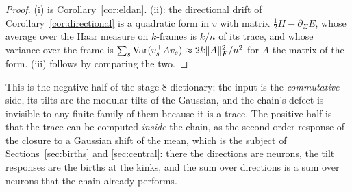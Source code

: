 \begin{proof}
(i) is Corollary~\ref{cor:eldan}. (ii): the directional drift of Corollary~\ref{cor:directional} is a quadratic
form in $v$ with matrix $\tfrac12H-\partial_\Sigma E$, whose average over the Haar measure on $k$-frames is $k/n$ of
its trace, and whose variance over the frame is $\sum_s\operatorname{Var}(v_s^{\top}Av_s)\approx 2k\|A\|_F^2/n^2$ for $A$ the
matrix of the form. (iii) follows by comparing the two.
\end{proof}

This is the negative half of the stage-8 dictionary: the input is the \emph{commutative} side, its tilts are the
modular tilts of the Gaussian, and the chain's defect is invisible to any finite family of them because it is a
trace. The positive half is that the trace can be computed \emph{inside} the chain, as the second-order response
of the closure to a Gaussian shift of the mean, which is the subject of Sections~\ref{sec:births} and
\ref{sec:central}: there the directions are neurons, the tilt responses are the births at the kinks, and the sum
over directions is a sum over neurons that the chain already performs.

